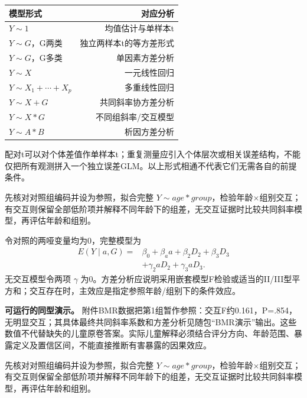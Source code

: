 
\begin{center}\small\setlength{\tabcolsep}{3.5pt}\renewcommand{\arraystretch}{1.18}\begin{tabular}{@{}lr@{}}
\toprule
模型形式 & 对应分析 \\
\midrule

\(Y\sim1\) & 均值估计与单样本t \\
\(Y\sim G\)，G两类 & 独立两样本t的等方差形式 \\
\(Y\sim G\)，G多类 & 单因素方差分析 \\
\(Y\sim X\) & 一元线性回归 \\
\(Y\sim X_1+\cdots+X_p\) & 多重线性回归 \\
\(Y\sim X+G\) & 共同斜率协方差分析 \\
\(Y\sim X*G\) & 不同组斜率/交互模型 \\
\(Y\sim A*B\) & 析因方差分析 \\
\bottomrule\end{tabular}\end{center}

配对t可以对个体差值作单样本t；重复测量应引入个体层次或相关误差结构，不能仅把所有观测拼入一个独立误差GLM。以上形式相通不代表它们无需各自的前提条件。



先核对对照组编码并设为参照，拟合完整 \(Y\sim age*group\)，检验年龄×组别交互；有交互则保留全部低阶项并解释不同年龄下的组差，无交互证据时比较共同斜率模型，再评估年龄和组别。

令对照的两哑变量均为0，完整模型为 \[\begin{aligned}E(Y\mid a,G)={}&\beta_0+\beta_a a+\beta_2D_2+\beta_3D_3\\&+\gamma_2aD_2+\gamma_3aD_3.\end{aligned}\] 无交互模型令两项 \(\gamma\) 为0。方差分析应说明采用嵌套模型F检验或适当的II/III型平方和；交互存在时，主效应是指定参照年龄/组别下的条件效应。

\textbf{可运行的同型演示。} 附件BMR数据把第1组暂作参照：交互F约0.161，P=.854，无明显交互；其具体最终共同斜率系数和方差分析见随包``BMR演示''输出。这些数值不代替缺失的儿童原卷答案。实际儿童解释必须结合评分方向、年龄范围、暴露定义及置信区间，不能直接推断有害暴露的因果效应。



先核对对照组编码并设为参照，拟合完整 \(Y\sim age*group\)，检验年龄×组别交互；有交互则保留全部低阶项并解释不同年龄下的组差，无交互证据时比较共同斜率模型，再评估年龄和组别。

